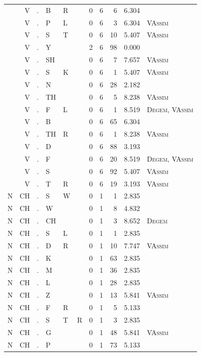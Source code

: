 \documentclass[12pt]{article}
\begin{document}
\begin{longtable}{r@{ } r@{ } c@{ } l@{ } l@{ } l@{ } r r r r l }
 & V & . & B & R &  & 0 & 6 & 6 & 6.304 &  \\
 & V & . & P & L &  & 0 & 6 & 3 & 6.304 & \textsc{VAssim} \\
 & V & . & S & T &  & 0 & 6 & 10 & 5.407 & \textsc{VAssim} \\
 & V & . & Y &  &  & 2 & 6 & 98 & 0.000 &  \\
 & V & . & SH &  &  & 0 & 6 & 7 & 7.657 & \textsc{VAssim} \\
 & V & . & S & K &  & 0 & 6 & 1 & 5.407 & \textsc{VAssim} \\
 & V & . & N &  &  & 0 & 6 & 28 & 2.182 &  \\
 & V & . & TH &  &  & 0 & 6 & 5 & 8.238 & \textsc{VAssim} \\
 & V & . & F & L &  & 0 & 6 & 1 & 8.519 & \textsc{Degem}, \textsc{VAssim} \\
 & V & . & B &  &  & 0 & 6 & 65 & 6.304 &  \\
 & V & . & TH & R &  & 0 & 6 & 1 & 8.238 & \textsc{VAssim} \\
 & V & . & D &  &  & 0 & 6 & 88 & 3.193 &  \\
 & V & . & F &  &  & 0 & 6 & 20 & 8.519 & \textsc{Degem}, \textsc{VAssim} \\
 & V & . & S &  &  & 0 & 6 & 92 & 5.407 & \textsc{VAssim} \\
 & V & . & T & R &  & 0 & 6 & 19 & 3.193 & \textsc{VAssim} \\
N & CH & . & S & W &  & 0 & 1 & 1 & 2.835 &  \\
N & CH & . & W &  &  & 0 & 1 & 8 & 4.832 &  \\
N & CH & . & CH &  &  & 0 & 1 & 3 & 8.652 & \textsc{Degem} \\
N & CH & . & S & L &  & 0 & 1 & 1 & 2.835 &  \\
N & CH & . & D & R &  & 0 & 1 & 10 & 7.747 & \textsc{VAssim} \\
N & CH & . & K &  &  & 0 & 1 & 63 & 2.835 &  \\
N & CH & . & M &  &  & 0 & 1 & 36 & 2.835 &  \\
N & CH & . & L &  &  & 0 & 1 & 28 & 2.835 &  \\
N & CH & . & Z &  &  & 0 & 1 & 13 & 5.841 & \textsc{VAssim} \\
N & CH & . & F & R &  & 0 & 1 & 5 & 5.133 &  \\
N & CH & . & S & T & R & 0 & 1 & 3 & 2.835 &  \\
N & CH & . & G &  &  & 0 & 1 & 48 & 5.841 & \textsc{VAssim} \\
N & CH & . & P &  &  & 0 & 1 & 73 & 5.133 &  \\

\end{longtable}
\end{document}
